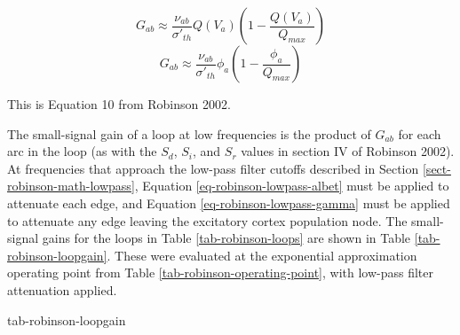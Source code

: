 \begin{equation}
G_{ab} \approx \frac{\nu_{ab}}{\sigma'_{th}}
Q(V_a) \left ( 1 - \frac{Q(V_a)}{Q_{max}} \right )
\end{equation}
%
\begin{equation}
G_{ab} \approx \frac{\nu_{ab}}{\sigma'_{th}}
\phi_a \left ( 1 - \frac{\phi_a}{Q_{max}} \right )
\label{eq-robinson-gain}
\end{equation}

This is Equation 10 from Robinson 2002.

The small-signal gain of a loop at low frequencies is the product of
$G_{ab}$ for each arc in the loop (as with the $S_d$, $S_i$, and $S_r$
values in section IV of Robinson 2002).
At frequencies that approach the low-pass filter cutoffs described in
Section \ref{sect-robinson-math-lowpass}, Equation
\ref{eq-robinson-lowpass-albet} must be applied to attenuate each edge, and
Equation \ref{eq-robinson-lowpass-gamma} must be applied to attenuate any
edge leaving the excitatory cortex population node.
The small-signal gains for the loops in Table \ref{tab-robinson-loops} are
shown in Table \ref{tab-robinson-loopgain}. These were evaluated at the
exponential approximation operating point from
Table \ref{tab-robinson-operating-point}, with low-pass filter attenuation
applied.

{tab-robinson-loopgain}

